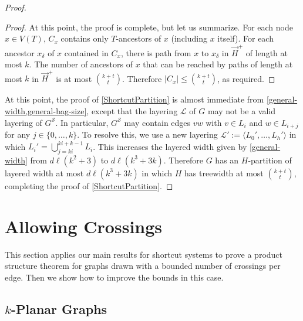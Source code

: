 \documentclass{patmorin}
\renewcommand{\SS}{\mathcal{S}}
\renewcommand{\le}{\leqslant}
\begin{document}
\begin{proof}
\begin{proof}
  At this point, the proof is complete, but let us summarize. For each node $x\in V(T)$, $C_x$ contains only $T$-ancestors of $x$ (including $x$ itself).  For each ancestor $x_\delta$ of $x$ contained in $C_x$, there is path from $x$ to $x_\delta$ in $\overrightarrow{H}^+$ of length at most $k$.  The number of ancestors of $x$ that can be reached by paths of length at most $k$ in $\overrightarrow{H}^+$ is at most $\binom{k+t}{t}$.  Therefore $|C_x|\le \binom{k+t}{t}$, as required.
\end{proof}

At this point, the proof of \cref{ShortcutPartition} is almost immediate from \cref{general-width,general-bag-size}, except that the layering $\mathcal{L}$ of $G$ may not be a valid layering of $G^{\SS}$.  In particular, $G^{\SS}$ may contain edges $vw$ with $v\in L_i$ and $w\in L_{i+j}$ for any $j\in\{0,\ldots,k\}$.  To resolve this, we use a new layering $\mathcal{L}':=\langle L_0',\ldots,L_h'\rangle$ in which $L_i'=\bigcup_{j=ki}^{ki+k-1} L_i$.  This increases the layered width given by \cref{general-width} from $d\ell(k^2+3)$ to $d\ell(k^3+3k)$.  Therefore $G$ has an $H$-partition of layered width at most $d\ell(k^3+3k)$ in which $H$ has treewidth at most $\binom{k+t}{t}$, completing the proof of \cref{ShortcutPartition}.
\end{proof}

\section{Allowing Crossings}
\label{sec-k-planar}

This section applies our main results for shortcut systems to prove a product structure theorem for graphs drawn with a bounded number of crossings per edge. Then we show how to improve the bounds in this case.

\subsection{$k$-Planar Graphs}
\end{document}
